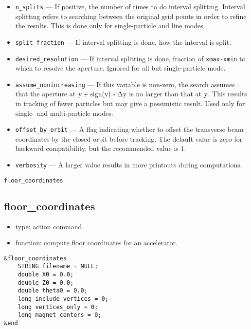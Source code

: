 \documentclass[11pt]{article}
\begin{document}
\begin{itemize}
\item \verb|n_splits| --- If positive, the number of times to do
interval splitting.  Interval splitting refers to searching between
the original grid points in order to refine the results.  This is done
only for single-particle and line modes.

\item \verb|split_fraction| --- If interval splitting is done, how the interval is split.

\item \verb|desired_resolution| --- If interval splitting is done,
fraction of \verb|xmax-xmin| to which to resolve the aperture.  Ignored for all but single-particle
mode.

\item \verb|assume_nonincreasing| --- If this variable is non-zero, the search assumes that the aperture
at ${\rm y+sign(y)*\Delta y}$ is no larger than that at ${\rm y}$.  This results in tracking of
fewer particles but may give a pessimistic result.    Used only for single- and multi-particle
modes.

\item \verb|offset_by_orbit| --- A flag indicating whether to offset
the transverse beam coordinates by the closed orbit before tracking.  The default value is
zero for backward compatibility, but the recommended value is 1.

\item \verb|verbosity| --- A larger value results in more printouts during computations.
\end{itemize}

\begin{latexonly}
\newpage
\begin{center}{\Large\verb|floor_coordinates|}\end{center}
\end{latexonly}
\subsection{floor\_coordinates \label{subsec:floorcoordinates}}

\begin{itemize}
\item type: action command.
\item function: compute floor coordinates for an accelerator.
\end{itemize}

\begin{verbatim}
&floor_coordinates
    STRING filename = NULL;
    double X0 = 0.0;
    double Z0 = 0.0;
    double theta0 = 0.0;
    long include_vertices = 0;
    long vertices_only = 0;
    long magnet_centers = 0;
&end
\end{verbatim}
\end{document}
